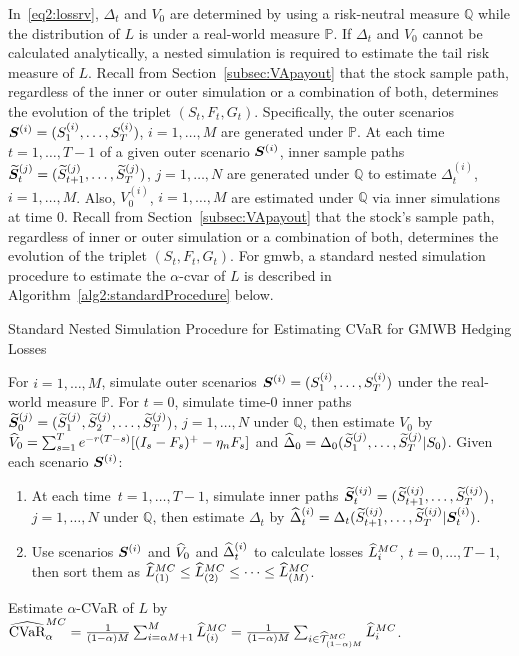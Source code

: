 In~\eqref{eq2:lossrv}, $\Delta_t$ and $V_0$ are determined by using a risk-neutral measure $\mathbb{Q}$ while the distribution of $L$ is under a real-world measure $\mathbb{P}$.
If $\Delta_t$ and $V_0$ cannot be calculated analytically, a nested simulation is required to estimate the tail risk measure of $L$.
Recall from Section~\ref{subsec:VApayout} that the stock sample path, regardless of the inner or outer simulation or a combination of both, determines the evolution of the triplet $(S_t,F_t,G_t)$.
Specifically, the outer scenarios $\bm{S}^{(i)} = (S_{1}^{(i)},\ldots,S_{T}^{(i)})$, $i=1,\ldots,M$ are generated under $\mathbb{P}$.
At each time~$t=1,\ldots,T-1$ of a given outer scenario $\bm{S}^{(i)}$, inner sample paths $\widetilde{\bm{S}}_{t}^{(j)} = (\widetilde{S}_{t+1}^{(j)},\ldots,\widetilde{S}_{T}^{(j)})$, $j=1,\ldots,N$ are generated under $\mathbb{Q}$ to estimate $\Delta_t^{(i)}$, $i=1,\ldots,M$.
Also, $V_0^{(i)}$, $i=1,\ldots,M$ are estimated under $\mathbb{Q}$ via inner simulations at time $0$.
Recall from Section~\ref{subsec:VApayout} that the stock's sample path, regardless of inner or outer simulation or a combination of both, determines the evolution of the triplet $(S_t,F_t,G_t)$.
For \gls{gmwb}, a standard nested simulation procedure to estimate the $\alpha$-\gls{cvar} of $L$ is described in Algorithm~\ref{alg2:standardProcedure} below.

\begin{algorithm} 
\caption{Standard Nested Simulation Procedure for Estimating CVaR for GMWB Hedging Losses}
\begin{algorithmic}[1] \label{alg2:standardProcedure}
    \STATE  For $i=1,\ldots,M$, simulate outer scenarios $\bm{S}^{(i)} = (S_{1}^{(i)},\ldots,S_{T}^{(i)})$ under the real-world measure $\mathbb{P}$.
    \STATE  For $t=0$, simulate time-$0$ inner paths $\widetilde{\bm{S}}_{0}^{(j)} = (\widetilde{S}_{1}^{(j)},\widetilde{S}_{2}^{(j)},\ldots,\widetilde{S}_{T}^{(j)})$, $j=1,\ldots,N$ under $\mathbb{Q}$, then estimate $V_0$ by $\widehat{V}_0 = \sum_{s=1}^{T} e^{-r(T-s)} [(I_s - F_s)^+- \eta_n F_s]$ and $\widehat{\Delta}_0 = \Delta_0(\widetilde{S}_{1}^{(j)},\ldots,\widetilde{S}_{T}^{(j)} | S_0)$.
    \STATE  Given each scenario $\bm{S}^{(i)}$:
    \begin{enumerate}[label=\alph*., itemsep=0pt, parsep=0pt, topsep=0pt]
        \item   At each time~$t=1,\ldots,T-1$, simulate inner paths $\widetilde{\bm{S}}_{t}^{(ij)} = (\widetilde{S}_{t+1}^{(ij)},\ldots,\widetilde{S}_{T}^{(ij)})$, $j=1,\ldots,N$ under $\mathbb{Q}$, then estimate $\Delta_t$ by $\widehat{\Delta}_t^{(i)} = \Delta_t(\widetilde{S}_{t+1}^{(ij)},\ldots,\widetilde{S}_{T}^{(ij)} | \bm{S}_t^{(i)})$.
        \item   Use scenarios $\bm{S}^{(i)}$ and $\widehat{V}_0$ and $\widehat{\Delta}_t^{(i)}$ to calculate losses $\widehat{L}_i^{MC}$, $t=0,\ldots,T-1$, then sort them as $\widehat{L}^{MC}_{(1)}\leq \widehat{L}^{MC}_{(2)} \leq \cdots\leq \widehat{L}^{MC}_{(M)}$.
    \end{enumerate}
    \STATE  Estimate $\alpha$-CVaR of $L$ by $\widehat{\mbox{CVaR}}^{MC}_\alpha = \frac{1}{(1-\alpha)M} \sum_{i=\alpha M + 1}^{M}\widehat{L}_{(i)}^{MC} = \frac{1}{(1-\alpha)M} \sum_{i \in \widehat{\mathcal{T}}_{(1-\alpha )M}^{MC}}\widehat{L}_{i}^{MC}$.
\end{algorithmic}
\end{algorithm}

